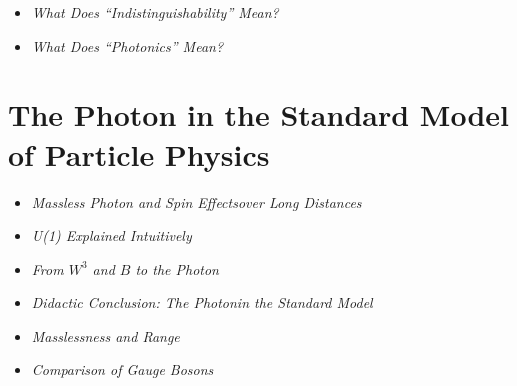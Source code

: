 \vspace{1em}
\begin{tcolorbox}[title=Reference Boxes, hinweisbox]
	\begin{itemize}
		\item \emph{What Does “Indistinguishability” Mean?} \dotfill\pageref{box:indistinguishability}
		\item \emph{What Does “Photonics” Mean?} \dotfill\pageref{box:photonics_definition}
	\end{itemize}
\end{tcolorbox}


\section{The Photon in the Standard Model of Particle Physics}
\vspace{1em}

\begin{tcolorbox}[title=Physical Boxes, physikbox]
	\begin{itemize}
		\item \emph{Massless Photon and Spin Effects\newline over Long Distances} \dotfill\pageref{box:photon_spin_reichweite}
	\end{itemize}
\end{tcolorbox}

\vspace{1em}
\begin{tcolorbox}[title=Didactic Boxes, didaktikbox]
	\begin{itemize}
		\item \emph{U(1) Explained Intuitively} \dotfill\pageref{box:u1_kreis}
		\item \emph{From \(W^3\) and \(B\) to the Photon} \dotfill\pageref{box:weinberg_mischung}
		\item \emph{Didactic Conclusion: The Photon\newline in the Standard Model} \dotfill\pageref{box:didaktik_kapVIII}
	\end{itemize}
\end{tcolorbox}

\vspace{1em}
\begin{tcolorbox}[title=Reference Boxes, hinweisbox]
	\begin{itemize}
		\item \emph{Masslessness and Range} \dotfill\pageref{box:reichweite_masselos}
		\item \emph{Comparison of Gauge Bosons} \dotfill\pageref{box:eichbosonen_vergleich}
	\end{itemize}
\end{tcolorbox}

